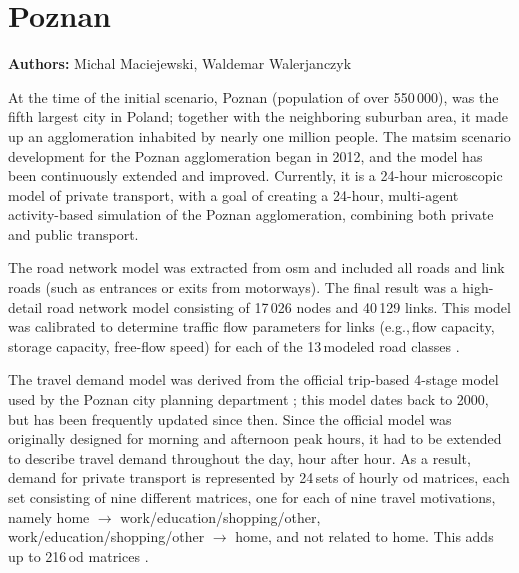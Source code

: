 \section{Poznan}
\label{sec:poznan}
\hfill \textbf{Authors:} Michal Maciejewski, Waldemar Walerjanczyk


At the time of the initial scenario, Poznan (population of over 550\,000), was the fifth largest city in Poland; together with the neighboring suburban area, it made up an agglomeration inhabited by nearly one million people. The \gls{matsim} scenario development for the Poznan agglomeration began in 2012, and the model has been continuously extended and improved. Currently, it is a 24-hour microscopic model of private transport, with a goal of creating a 24-hour, multi-agent activity-based simulation of the Poznan agglomeration, combining both private and public transport.

The road network model was extracted from \gls{osm} and included all roads and link roads (such as entrances or exits from motorways). The final result was a high-detail road network model consisting of 17\,026 nodes and 40\,129 links. This model was calibrated to determine traffic flow parameters for links (e.g.,\,flow capacity, storage capacity, free-flow speed) for each of the 13\,modeled road classes \citep{PiatkowskiMaciejewski2012osmNetwork}.

The travel demand model was derived from the official trip-based 4-stage model used by the Poznan city planning department ; this model dates back to 2000, but has been frequently updated since then. Since the official model was originally designed for morning and afternoon peak hours, it had to be extended to describe travel demand throughout the day, hour after hour. As a result, demand for private transport is represented by 24\,sets of hourly \gls{od} matrices, each set consisting of nine different matrices, one for each of nine travel motivations, namely home $\rightarrow$ work/education/shopping/other, work/education/shopping/other $\rightarrow$ home, and not related to home. This adds up to 216\,\gls{od} matrices \citep{PiatkowskiEtAl2013Poznan24hSimulation, MaciejewskiEtAl2014MikroMakro}.

